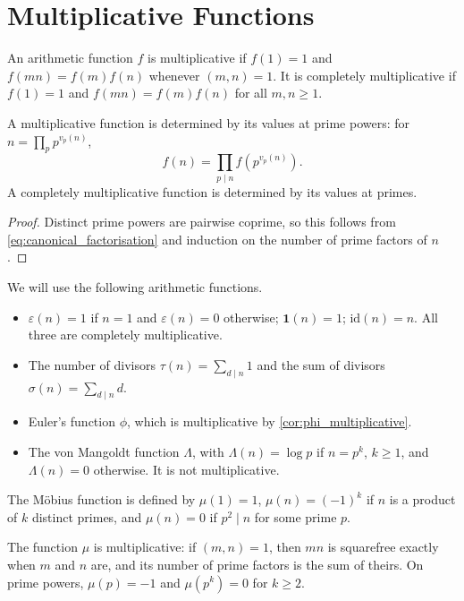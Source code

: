 \section{Multiplicative Functions}

\begin{definition}\label{def:multiplicative}
    An arithmetic function $f$ is multiplicative if $f(1) = 1$ and $f(mn) = f(m)f(n)$ whenever $(m,n) = 1$. It is completely multiplicative if $f(1) = 1$ and $f(mn) = f(m)f(n)$ for all $m, n \ge 1$.
\end{definition}

\begin{proposition}\label{prop:multiplicative_prime_powers}
    A multiplicative function is determined by its values at prime powers: for $n = \prod_p p^{v_p(n)}$,
    \begin{equation*}
        f(n) = \prod_{p \mid n} f\left(p^{v_p(n)}\right).
    \end{equation*}
    A completely multiplicative function is determined by its values at primes.
\end{proposition}
\begin{proof}
    Distinct prime powers are pairwise coprime, so this follows from \cref{eq:canonical_factorisation} and induction on the number of prime factors of $n$.
\end{proof}

We will use the following arithmetic functions.
\begin{itemize}
    \item $\varepsilon(n) = 1$ if $n = 1$ and $\varepsilon(n) = 0$ otherwise; $\mathbf{1}(n) = 1$; $\mathrm{id}(n) = n$. All three are completely multiplicative.
    \item The number of divisors $\tau(n) = \sum_{d \mid n} 1$ and the sum of divisors $\sigma(n) = \sum_{d \mid n} d$.
    \item Euler's function $\phi$, which is multiplicative by \cref{cor:phi_multiplicative}.
    \item The von Mangoldt function $\Lambda$, with $\Lambda(n) = \log p$ if $n = p^k$, $k \ge 1$, and $\Lambda(n) = 0$ otherwise. It is not multiplicative.
\end{itemize}

\begin{definition}\label{def:mobius}
    The Möbius function is defined by $\mu(1) = 1$, $\mu(n) = (-1)^k$ if $n$ is a product of $k$ distinct primes, and $\mu(n) = 0$ if $p^2 \mid n$ for some prime $p$.
\end{definition}
The function $\mu$ is multiplicative: if $(m,n) = 1$, then $mn$ is squarefree exactly when $m$ and $n$ are, and its number of prime factors is the sum of theirs. On prime powers, $\mu(p) = -1$ and $\mu(p^k) = 0$ for $k \ge 2$.
